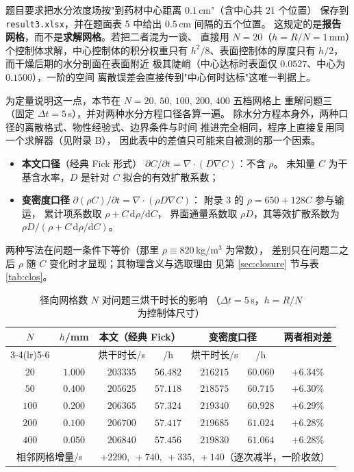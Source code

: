 \documentclass[12pt,a4paper,fontset=none]{ctexart}
\begin{document}
题目要求把水分浓度场按"到药材中心距离 $0.1$\,cm"（含中心共 $21$ 个位置）
保存到 \texttt{result3.xlsx}，并在题面表 5 中给出 $0.5$\,cm 间隔的五个位置。
这规定的是\textbf{报告网格}，而不是\textbf{求解网格}。若把二者混为一谈、
直接用 $N=20$（$h=R/N=1$\,mm）个控制体求解，中心控制体的积分权重只有
$h^2/8$、表面控制体的厚度只有 $h/2$，而干燥后期的水分剖面在表面附近
极其陡峭（中心达标时表面仅 $0.0527$、中心为 $0.1500$），一阶的空间
离散误差会直接传到"中心何时达标"这唯一判据上。

为定量说明这一点，本节在 $N=20,\,50,\,100,\,200,\,400$ 五档网格上
重解问题三（固定 $\Delta t=5$\,s），并对两种水分方程口径各算一遍。
除水分方程本身外，两种口径的离散格式、物性经验式、边界条件与时间
推进完全相同，程序上直接复用同一个求解器（见附录 B），
因此表中的差值只可能来自被测的那一个因素。

\begin{itemize}
  \item \textbf{本文口径}（经典 Fick 形式）
        $\partial C/\partial t=\nabla\!\cdot\!(D\nabla C)$：不含 $\rho$。
        未知量 $C$ 为干基含水率，$D$ 是针对 $C$ 拟合的有效扩散系数；
  \item \textbf{变密度口径}
        $\partial(\rho C)/\partial t=\nabla\!\cdot\!(\rho D\nabla C)$：
        附录 3 的 $\rho=650+128C$ 参与输运，
        累计项系数取 $\rho+C\,\mathrm{d}\rho/\mathrm{d}C$，
        界面通量系数取 $\rho D$，其等效扩散系数为
        $\rho D/(\rho+C\,\mathrm{d}\rho/\mathrm{d}C)$。
\end{itemize}

两种写法在问题一条件下等价（那里 $\rho\equiv820$\,kg/m$^3$ 为常数），
差别只在问题二之后 $\rho$ 随 $C$ 变化时才显现；其物理含义与选取理由
见第 \ref{sec:closure} 节与表 \ref{tab:clos}。

\begin{table}[htbp]
  \centering
  \caption{径向网格数 $N$ 对问题三烘干时长的影响
    （$\Delta t=5$\,s，$h=R/N$ 为控制体尺寸）}
  \label{tab:grid-N}
  \small
  \begin{tabular}{ccccccc}
    \toprule
    $N$ & $h$/mm & \multicolumn{2}{c}{本文（经典 Fick）}
      & \multicolumn{2}{c}{变密度口径} & 两者相对差 \\
    \cmidrule(lr){3-4}\cmidrule(lr){5-6}
     & & 烘干时长/s & /h & 烘干时长/s & /h & \\
    \midrule
    $20$  & $1.000$ & $203335$ & $56.482$ & $216215$ & $60.060$ & $+6.34\%$ \\
    $50$  & $0.400$ & $205625$ & $57.118$ & $218575$ & $60.715$ & $+6.30\%$ \\
    $100$ & $0.200$ & $206365$ & $57.324$ & $219340$ & $60.928$ & $+6.29\%$ \\
    $200$ & $0.100$ & $206700$ & $57.417$ & $219685$ & $61.024$ & $+6.28\%$ \\
    $400$ & $0.050$ & $206840$ & $57.456$ & $219830$ & $61.064$ & $+6.28\%$ \\
    \midrule
    \multicolumn{2}{c}{相邻网格增量/s}
      & \multicolumn{5}{c}{$+2290,\ +740,\ +335,\ +140$（逐次减半，一阶收敛）} \\
    \bottomrule
  \end{tabular}
\end{table}
\end{document}
